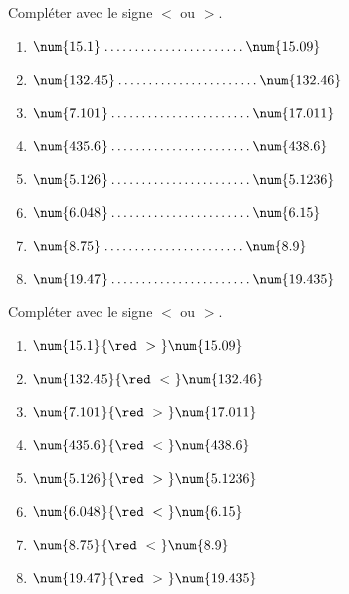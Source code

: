 \begin{exercice} %
    Compléter avec le signe $<$ ou $>$. \medskip
    \begin{multicols}{2}
        \begin{spacing}{1.5}
            \begin{enumerate}
                \item $\num{15.1  } \makebox[0.3\linewidth]{\dotfill} \num{15.09 }$ 
                \item $\num{132.45} \makebox[0.3\linewidth]{\dotfill} \num{132.46}$ 
                \item $\num{7.101 } \makebox[0.3\linewidth]{\dotfill} \num{17.011}$ 
                \item $\num{435.6 } \makebox[0.3\linewidth]{\dotfill} \num{438.6 }$ 
                \item $\num{5.126 } \makebox[0.3\linewidth]{\dotfill} \num{5.1236}$
                \item $\num{6.048 } \makebox[0.3\linewidth]{\dotfill} \num{6.15  }$
                \item $\num{8.75  } \makebox[0.3\linewidth]{\dotfill} \num{8.9   }$
                \item $\num{19.47 } \makebox[0.3\linewidth]{\dotfill} \num{19.435}$            
            \end{enumerate}
        \end{spacing}
    \end{multicols}
 \end{exercice}
 
 \begin{corrige}
    Compléter avec le signe $<$ ou $>$. \medskip
    
    \begin{multicols}{2}
        \begin{enumerate}
            \item $\num{15.1  } {\red~>~} \num{15.09 }$ 
            \item $\num{132.45} {\red~<~} \num{132.46}$ 
            \item $\num{7.101 } {\red~>~} \num{17.011}$ 
            \item $\num{435.6 } {\red~<~} \num{438.6 }$ 
            \item $\num{5.126 } {\red~>~} \num{5.1236}$
            \item $\num{6.048 } {\red~<~} \num{6.15  }$
            \item $\num{8.75  } {\red~<~} \num{8.9   }$
            \item $\num{19.47 } {\red~>~} \num{19.435}$
        \end{enumerate}
    \end{multicols}
\end{corrige}